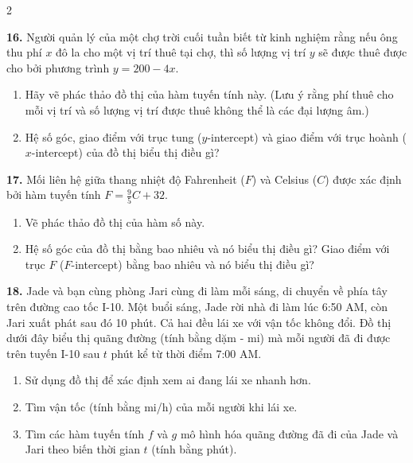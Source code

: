 \fancyhead[R]{}

\begin{multicols}{2}
\fontsize{8.5pt}{10.8pt}\selectfont
\setlength{\abovedisplayskip}{2pt}
\setlength{\belowdisplayskip}{2pt}

\noindent\textbf{16.} Người quản lý của một chợ trời cuối tuần biết từ kinh nghiệm rằng nếu ông thu phí $x$ đô la cho một vị trí thuê tại chợ, thì số lượng vị trí $y$ sẽ được thuê được cho bởi phương trình $y = 200 - 4x$.
\begin{enumerate}[label=(\alph*), leftmargin=*, itemsep=1pt]
    \item Hãy vẽ phác thảo đồ thị của hàm tuyến tính này. (Lưu ý rằng phí thuê cho mỗi vị trí và số lượng vị trí được thuê không thể là các đại lượng âm.)
    \item Hệ số góc, giao điểm với trục tung ($y$-intercept) và giao điểm với trục hoành ($x$-intercept) của đồ thị biểu thị điều gì?
\end{enumerate}

\noindent\textbf{17.} Mối liên hệ giữa thang nhiệt độ Fahrenheit ($F$) và Celsius ($C$) được xác định bởi hàm tuyến tính $F = \frac{9}{5}C + 32$.
\begin{enumerate}[label=(\alph*), leftmargin=*, itemsep=1pt]
    \item Vẽ phác thảo đồ thị của hàm số này.
    \item Hệ số góc của đồ thị bằng bao nhiêu và nó biểu thị điều gì? Giao điểm với trục $F$ ($F$-intercept) bằng bao nhiêu và nó biểu thị điều gì?
\end{enumerate}

\noindent\textbf{18.} Jade và bạn cùng phòng Jari cùng đi làm mỗi sáng, di chuyển về phía tây trên đường cao tốc I-10. Một buổi sáng, Jade rời nhà đi làm lúc 6:50 AM, còn Jari xuất phát sau đó 10 phút. Cả hai đều lái xe với vận tốc không đổi. Đồ thị dưới đây biểu thị quãng đường (tính bằng dặm - mi) mà mỗi người đã đi được trên tuyến I-10 sau $t$ phút kể từ thời điểm 7:00 AM.
\begin{enumerate}[label=(\alph*), leftmargin=*, itemsep=1pt]
    \item Sử dụng đồ thị để xác định xem ai đang lái xe nhanh hơn.
    \item Tìm vận tốc (tính bằng mi/h) của mỗi người khi lái xe.
    \item Tìm các hàm tuyến tính $f$ và $g$ mô hình hóa quãng đường đã đi của Jade và Jari theo biến thời gian $t$ (tính bằng phút).
\end{enumerate}


\end{multicols}
